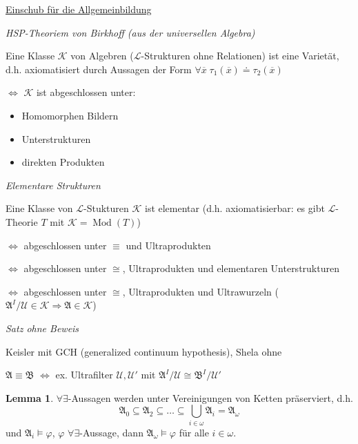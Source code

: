 \documentclass[12pt,parskip=full]{scrartcl}
\newcommand{\heading}{\underline}
\theoremstyle{definition}
\newtheorem{lemma}[theorem]{Lemma}
\begin{document}
	\heading{Einschub für die Allgemeinbildung}
	
	\textit{HSP-Theoriem von Birkhoff (aus der universellen Algebra)}
	
	Eine Klasse $\mathcal{K}$ von Algebren ($\mathcal{L}$-Strukturen ohne Relationen) ist eine Varietät, d.h. axiomatisiert durch Aussagen der Form $\forall \overline{x} \; \tau_1(\overline{x}) \doteq \tau_2(\overline{x})$
	
	$\Leftrightarrow$ $\mathcal{K}$ ist abgeschlossen unter:
	\begin{itemize}
		\item Homomorphen Bildern
		\item Unterstrukturen
		\item direkten Produkten
	\end{itemize}

	\textit{Elementare Strukturen}
	
	Eine Klasse von $\mathcal{L}$-Stukturen $\mathcal{K}$ ist elementar (d.h. axiomatisierbar: es gibt $\mathcal{L}$-Theorie $T$ mit $\mathcal{K} = \operatorname{Mod}(T)$)
	
	$\Leftrightarrow$ abgeschlossen unter $\equiv$ und Ultraprodukten
	
	$\Leftrightarrow$ abgeschlossen unter $\cong$, Ultraprodukten und elementaren Unterstrukturen
	
	$\Leftrightarrow$ abgeschlossen unter $\cong$, Ultraprodukten und Ultrawurzeln ($\mathfrak{A}^I/\mathcal{U} \in \mathcal{K} \Rightarrow \mathfrak{A} \in \mathcal{K}$)
	
	\textit{Satz ohne Beweis}
	
	Keisler mit GCH (generalized continuum hypothesis), Shela ohne
	
	$\mathfrak{A} \equiv \mathfrak{B}$ $\Leftrightarrow$ ex. Ultrafilter $\mathcal{U}, \mathcal{U}'$ mit $\mathfrak{A}^I/\mathcal{U} \cong \mathfrak{B}^I/\mathcal{U}'$
	
	\begin{lemma}
		$\forall \exists$-Aussagen werden unter Vereinigungen von Ketten präserviert, d.h.
		\begin{equation*}
			\mathfrak{A}_0 \subseteq \mathfrak{A}_2 \subseteq \dots \subseteq \bigcup_{i \in \omega} \mathfrak{A}_i = \mathfrak{A}_\omega
		\end{equation*}
		und $\mathfrak{A}_i \models \varphi$, $\varphi$ $\forall \exists$-Aussage, dann $\mathfrak{A}_\omega \models \varphi$ für alle $i \in \omega$.
	\end{lemma}
\end{document}
